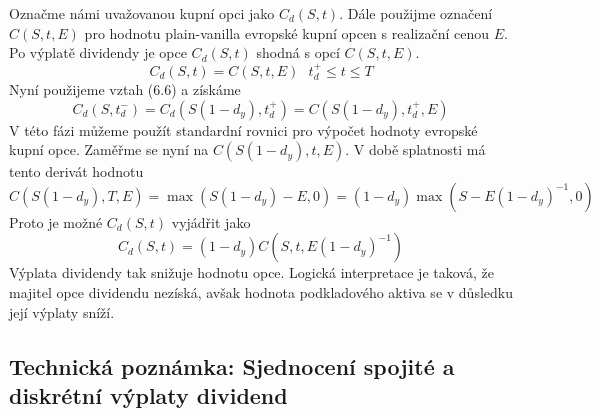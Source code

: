 \documentclass[a4paper]{book}
\begin{document}
Označme námi uvažovanou kupní opci jako $C_d(S,t)$. Dále použijme označení $C(S, t, E)$ pro hodnotu plain-vanilla evropské kupní opcen s realizační cenou $E$. Po výplatě dividendy je opce $C_d(S,t)$ shodná s opcí $C(S,t,E)$.
\begin{equation*}
C_d(S,t) = C(S,t,E)~~~t_d^+ \le t \le T
\end{equation*}
Nyní použijeme vztah (6.6) a získáme
\begin{equation*}
C_d(S, t_d^-) = C_d(S(1-d_y),t_d^+) = C(S(1-d_y),t_d^+,E)
\end{equation*}
V této fázi můžeme použít standardní rovnici pro výpočet hodnoty evropské kupní opce. Zaměřme se nyní na $C(S(1 - d_y),t,E)$. V době splatnosti má tento derivát hodnotu
\begin{equation*}
C(S(1-d_y),T,E) = \max(S(1 - d_y) - E, 0) = (1 - d_y)\max(S - E(1 - d_y)^{-1},0)
\end{equation*}
Proto je možné $C_d(S,t)$ vyjádřit jako
\begin{equation*}
C_d(S,t) = (1 - d_y)C(S, t, E(1 - d_y)^{-1})
\end{equation*}
Výplata dividendy tak snižuje hodnotu opce. Logická interpretace je taková, že majitel opce dividendu nezíská, avšak hodnota podkladového aktiva se v důsledku její výplaty sníží.

\subsection{Technická poznámka: Sjednocení spojité a diskrétní výplaty dividend}
\end{document}
